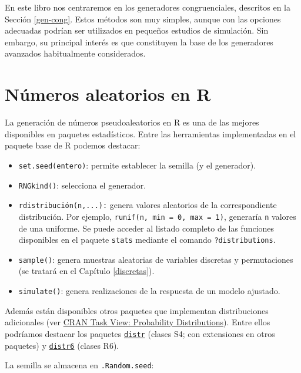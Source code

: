\documentclass[
]{book}
\theoremstyle{break}
\theoremstyle{nonumberplain}
\begin{document}
En este libro nos centraremos en los generadores congruenciales, descritos en la Sección \ref{gen-cong}.
Estos métodos son muy simples, aunque con las opciones adecuadas podrían ser utilizados en pequeños estudios de simulación. Sin embargo, su principal interés es que constituyen la base de los generadores avanzados habitualmente considerados.

\hypertarget{rrng}{%
\section{Números aleatorios en R}\label{rrng}}

La generación de números pseudoaleatorios en R es una de las mejores
disponibles en paquetes estadísticos.
Entre las herramientas implementadas en el paquete base de R podemos destacar:

\begin{itemize}
\item
  \texttt{set.seed(entero)}: permite establecer la semilla (y el generador).
\item
  \texttt{RNGkind()}: selecciona el generador.
\item
  \texttt{rdistribución(n,...):} genera valores aleatorios de la correspondiente distribución.
  Por ejemplo, \texttt{runif(n,\ min\ =\ 0,\ max\ =\ 1)}, generaría \texttt{n} valores de una uniforme. Se puede acceder al listado completo de las funciones disponibles en el paquete \texttt{stats} mediante el comando \texttt{?distributions}.
\item
  \texttt{sample()}: genera muestras aleatorias de variables discretas y permutaciones (se tratará en el Capítulo \ref{discretas}).
\item
  \texttt{simulate()}: genera realizaciones de la respuesta de un modelo ajustado.
\end{itemize}

Además están disponibles otros paquetes que implementan distribuciones adicionales (ver \href{https://cran.r-project.org/view=Distributions}{CRAN Task View: Probability Distributions}).
Entre ellos podríamos destacar los paquetes \href{http://distr.r-forge.r-project.org}{\texttt{distr}} (clases S4; con extensiones en otros paquetes) y \href{https://alan-turing-institute.github.io/distr6/index.html}{\texttt{distr6}} (clases R6).

La semilla se almacena en \texttt{.Random.seed}:
\end{document}
